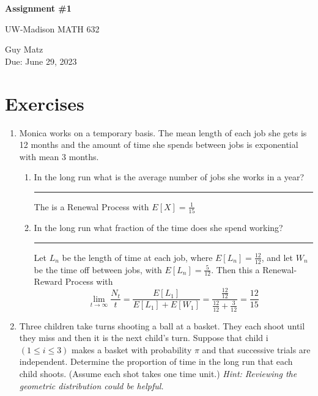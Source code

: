 \documentclass{article} %
\theoremstyle{plain}
\theoremstyle{case}
\begin{document}
\begin{center}
\Large{\textbf{Assignment \#1}
            
UW-Madison MATH 632} %
\vspace{5pt}
        
\normalsize{  Guy Matz%
        \\ Due: June 29, 2023}
\vspace{15pt}
\end{center}

\section*{Exercises}%
\begin{enumerate}[label={\fbox{\textbf{Exercise \#\arabic* :}}}]
  \item Monica works on a temporary basis. The mean length of each job she
    gets is 12 months and the amount of time she spends between jobs
    is exponential with mean 3 months.
    \begin{enumerate}
      \item In the long run what is the average number of jobs she works in a year?

\par\noindent\rule{\textwidth}{0.1pt}
        The is a Renewal Process with $E[X] = \frac{1}{15} $ 

      \item  In the long run what fraction of the time does she spend working?

\par\noindent\rule{\textwidth}{0.1pt}
        Let $L_n$ be the length of time at each job, where $E[L_n] = 
        \frac{12}{12}$, and let $W_n$ be the time off between jobs, with
        $E[L_n] = \frac{5}{12}$.
        Then this a Renewal-Reward Process with 
        \[ \lim_{t \to \infty} \frac{N_t}{t} =
        \frac{E[L_1]}{E[L_1] + E[W_1]}  = \frac{\frac{12}{12}}{\frac{12}{12} + \frac{3}{12} } = \frac{12}{15}    \]

    \end{enumerate}
  \newpage
  \item Three children take turns shooting a ball at a basket. They each
    shoot until they miss and then it is the next child’s turn. Suppose
    that child i $(1 \leq i \leq 3)$ makes a basket with probability $\pi$
    and that successive trials are independent. Determine the proportion of
    time in the long run that each child shoots. (Assume each shot takes
    one time unit.) \emph{Hint: Reviewing the geometric distribution
      could be helpful.}


\end{enumerate}
\end{document}
